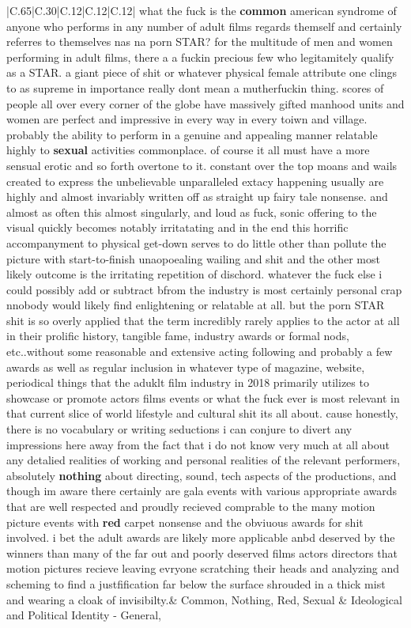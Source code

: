 \documentclass[11pt]{article}
\newlength\mylength
\begin{document}
\begin{center}
\begin{longtable}{|C{.65\mylength}|C{.30\mylength}|C{.12\mylength}|C{.12\mylength}|C{.12\mylength}|}
  \small what the fuck is the \textbf{common}  american syndrome of anyone who performs in any number of adult films regards themself and certainly referres to themselves nas na porn STAR? for the multitude of men and women performing in adult films, there a a fuckin precious few who legitamitely qualify as a STAR. a giant piece of shit or whatever physical female attribute one clings to as supreme in importance really dont mean a mutherfuckin thing. scores of people all over every corner of the globe have massively gifted manhood units and women are perfect  and impressive in every way in every toiwn and village. probably the ability to perform in a genuine and appealing manner relatable highly to \textbf{sexual} activities commonplace. of course it all must have a more sensual erotic and so forth overtone to it. constant over the top moans and wails created to express the unbelievable unparalleled extacy happening usually are highly and almost invariably written off as straight up fairy tale nonsense. and almost as often this almost singularly, and loud as fuck, sonic offering to the visual quickly becomes notably irritatating  and in the end this horrific accompanyment to physical get-down serves to do little other than pollute the picture with start-to-finish unaopoealing wailing and shit and the other most likely outcome is the irritating repetition of dischord. whatever the fuck else i could possibly add or subtract bfrom the industry is most certainly personal crap nnobody would likely find enlightening or relatable at all. but the porn STAR shit is so overly applied that the term incredibly rarely applies to the actor at all  in their prolific history, tangible fame, industry awards or formal nods, etc..without some reasonable and extensive acting following and probably a few awards as well as regular inclusion in whatever type of magazine, website, periodical things that the aduklt film industry in 2018 primarily utilizes to showcase or promote actors films events or what the fuck ever is most relevant in that current slice of world lifestyle and cultural shit its all about. cause honestly, there is no vocabulary or writing seductions i can conjure to divert any impressions here away from the fact that i do not know very much at all about any detalied realities of working and personal realities of the relevant performers, absolutely \textbf{nothing} about directing, sound, tech aspects of the productions, and though im aware there certainly are gala events with various appropriate awards that are well respected and proudly recieved comprable to the many motion picture events with \textbf{r\textbf{ed}} carpet nonsense and the obviuous awards for shit involved. i bet the adult awards are likely more applicable anbd deserved by the winners than many of the far out and poorly deserved films actors directors that motion pictures recieve leaving evryone scratching their heads and analyzing and scheming to find a justfification far below the surface shrouded in a thick mist and wearing a cloak of invisibilty.\normalsize   & Common, Nothing, Red, Sexual &  Ideological and Political Identity - General, 
\end{longtable}
\end{center}
\end{document}
